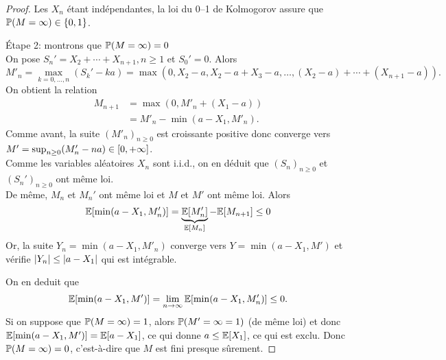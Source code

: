 \begin{proof}
    Les \(X_n\) étant indépendantes, la loi du 0--1 de Kolmogorov
    assure que \(\mathbb{P}(M=\infty) \in \{0,1\}\).
    
    \ptr{} \'Etape 2: montrons que \(\mathbb{P}(M=\infty) = 0\)\\
    On pose \(S_n' = X_2 + \cdots + X_{n+1}, n\geq 1\) et \(S_0' = 0\).
    Alors
    \begin{equation*}
        M'_n = \max\limits_{k=0, \ldots, n} (S_k' - ka) = \max(0, X_2 - a, X_2 - a + X_3 - a, \ldots, (X_2 - a) + \cdots + (X_{n+1} - a)).
    \end{equation*}
    On obtient la relation
    \begin{equation*}
        \begin{aligned}
            M_{n+1} 
            &= \max(0,M'_n + (X_1 - a))\\
            &= M'_n - \min(a - X_1, M'_n).
        \end{aligned}
    \end{equation*}
    Comme avant, la suite \({(M'_n)}_{n\geq 0}\) est croissante
    positive donc converge vers \(M' = \sup_{n\geq 0} (M_n' - na)\in \mathopen{}\left[0, +\infty\right]\mathclose{}\).\\
    Comme les variables aléatoires \(X_n\) sont i.i.d., on en déduit
    que \({(S_n)}_{n\geq 0}\) et \({(S_n')}_{n\geq 0}\) ont même loi.\\
    De même, \(M_n\) et \(M_n'\) ont même loi et
    \(M\) et \(M'\) ont même loi. Alors
    \begin{equation*}
        \mathbb{E}[\min(a - X_1, M'_n)] = \underbrace{\mathbb{E}[M'_n]}_{\mathbb{E}[M_n]} - \mathbb{E}[M_{n+1}] \leq 0
    \end{equation*}
    Or, la suite \(Y_n = \min(a-X_1,M'_n)\) converge vers
    \(Y = \min(a-X_1,M')\) et vérifie \(\mathopen{}\left|Y_n\right|\mathclose{} \leq \mathopen{}\left|a-X_1\right|\mathclose{}\)
    qui est intégrable.

    On en deduit que
    \begin{equation*}
        \mathbb{E}[\min(a - X_1, M')] = \lim_{n\to\infty} \mathbb{E}[\min(a - X_1, M'_n)] \leq 0.
    \end{equation*}
    Si on suppose que \(\mathbb{P}(M=\infty) = 1\), alors
    \(\mathbb{P}(M'=\infty = 1)\) (de même loi) et donc
    \(\mathbb{E}[\min(a - X_1, M')] = \mathbb{E}[a-X_1]\), ce qui donne
    \(a\leq \mathbb{E}[X_1]\), ce qui est exclu. Donc \(\mathbb{P}(M=\infty) = 0\),
    c'est-à-dire que \(M\) est fini presque sûrement.


\end{proof}
